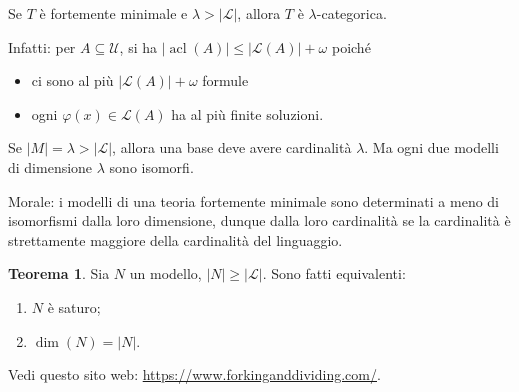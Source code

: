 \documentclass[10pt]{article}
\newcommand{\card}[1]{\left\vert #1 \right\vert}
\newcommand{\1}{\mathds{1}}
\theoremstyle{definition}%
\newtheorem{thm}{Teorema}[section]
\theoremstyle{plain}
\theoremstyle{remark}
\begin{document}
Se \(T\) è fortemente minimale e \(\lambda>\card{\mathcal{L}}\), allora \(T\) è \(\lambda\)-categorica.

Infatti: per \(A \subseteq \mathcal{U}\), si ha \(\card{\operatorname{acl}(A)}\le\card{\mathcal{L}(A)}+\omega\) poiché
\begin{itemize}
\item ci sono al più \(\card{\mathcal{L}(A)}+\omega\) formule
\item ogni \(\varphi(x) \in \mathcal{L}(A)\) ha al più finite soluzioni.
\end{itemize}

Se \(\card{M}=\lambda>\card{\mathcal{L}}\), allora una base deve avere cardinalità \(\lambda\). Ma ogni due modelli di dimensione \(\lambda\) sono isomorfi.

Morale: i modelli di una teoria fortemente minimale sono determinati a meno di isomorfismi dalla loro dimensione, dunque dalla loro cardinalità se la cardinalità è strettamente maggiore della cardinalità del linguaggio.

\begin{thm}
Sia \(N\) un modello, \(\card{N}\ge \card{\mathcal{L}}\). Sono fatti equivalenti:
\begin{enumerate}
\item \(N\) è saturo;
\item \(\dim(N)=\card{N}\).
\end{enumerate}
\end{thm}

Vedi questo sito web: \url{https://www.forkinganddividing.com/}.
\end{document}
